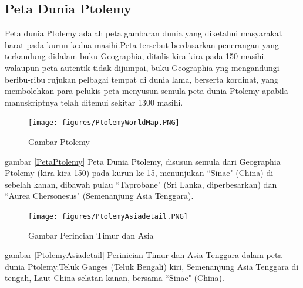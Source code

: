 \subsection{Peta Dunia Ptolemy}
		Peta dunia Ptolemy adalah peta gambaran dunia yang diketahui masyarakat barat pada kurun kedua masihi.Peta tersebut berdasarkan penerangan yang terkandung didalam buku Geographia, ditulis kira-kira pada 150 masihi. walaupun peta autentik tidak dijumpai, buku Geographia yng mengandungi beribu-ribu rujukan pelbagai tempat di dunia lama, berserta kordinat, yang membolehkan para pelukis peta menyusun semula peta dunia Ptolemy apabila manuskriptnya telah ditemui sekitar 1300 masihi.
	\begin{figure} [ht]
	\centerline{\texttt{[image: figures/PtolemyWorldMap.PNG]}}
	\caption{Gambar Ptolemy}	
	\label{PtolemyWorldMap}
	\end{figure}	
	gambar \ref{PetaPtolemy} Peta Dunia Ptolemy, disusun semula dari Geographia Ptolemy (kira-kira 150) pada kurun ke 15, menunjukan ``Sinae" (China) di sebelah kanan, dibawah pulau ``Taprobane" (Sri Lanka, diperbesarkan) dan ``Aurea Chersonesus" (Semenanjung Asia Tenggara).
	\begin{figure} [ht]
	\centerline{\texttt{[image: figures/PtolemyAsiadetail.PNG]}}	
	\caption{Gambar Perincian Timur dan Asia}		
	\end{figure}
	gambar \ref{PtolemyAsiadetail} Perinician Timur dan Asia Tenggara dalam peta dunia Ptolemy.Teluk Ganges (Teluk Bengali) kiri, Semenanjung Asia Tenggara di tengah, Laut China selatan kanan, bersama ``Sinae" (China).
